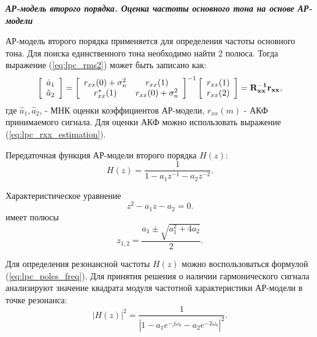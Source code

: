{\bf{\textit{АР-модель второго порядка. Оценка частоты основного тона на основе АР-модели}}}

АР-модель второго порядка применяется для определения частоты основного тона. Для поиска единственного
тона необходимо найти 2 полюса. Тогда выражение (\ref{eq:lpc_rms2}) может быть записано как:
\begin{equation}
	\label{eq:lpc_a_estimation}
	\left[ \begin{array}{c}
		\hat{a}_1 \\
		\hat{a}_2
	\end{array} \right]
	=
		\left[ \begin{array}{cc}
			r_{xx}(0)  + \sigma_n^2 & r_{xx}(1)\\
			r_{xx}^*(1) & r_{xx}(0) + \sigma_n^2 
		\end{array} \right]^{-1}
		\left[ \begin{array}{c}
			r_{xx}(1) \\
			r_{xx}(2)
		\end{array} \right]
	= \bf{R_{xx}^{-1}r_{xx}},
\end{equation}
где ${\hat{a}_1, \hat{a}_2}$, - МНК оценки коэффициентов АР-модели, ${r_{xx}(m)}$ - АКФ принимаемого сигнала.
Для оценки АКФ  можно использовать выражение (\ref{eq:lpc_rxx_estimation}).

Передаточная функция АР-модели второго порядка ${H(z)}$:
\begin{equation}
	\label{eq:lpc_spectral_func}
	H(z) = \frac{1}{1 - a_1 z^{-1} - a_2 z^{-2}}.
\end{equation}

Характеристическое уравнение
\begin{equation}
	\label{eq:lpc_characteristic}
	z^2 - a_1 z - a_2 = 0.
\end{equation}
имеет полюсы
\begin{equation}
	\label{eq:lpc_poles_2}
	z_{1,2} =\frac{a_1 \pm \sqrt{a_1^2 + 4 a_2}}{2}.
\end{equation}

Для определения резонансной частоты ${H(z)}$ можно воспользоваться формулой (\ref{eq:lpc_poles_freq}).
Для принятия решения о наличии гармонического сигнала анализируют значение квадрата модуля частотной
характеристики АР-модели в точке резонанса:
\begin{equation}
	\label{eq:lpc_power_cos}
	\left| H(z) \right|^2 = \frac{1}{\left| 1 - a_1 e^{-j \omega_0} - a_2 e^{-2 \omega_0} \right|^2}.
\end{equation}


